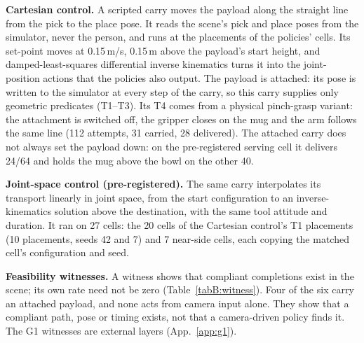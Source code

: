 \textbf{Cartesian control.} A scripted carry moves the payload along the straight line from the pick to the place pose. It reads the scene's pick and place poses from the simulator, never the person, and runs at the placements of the policies' cells. Its set-point moves at 0.15\,m/s, 0.15\,m above the payload's start height, and damped-least-squares differential inverse kinematics turns it into the joint-position actions that the policies also output. The payload is attached: its pose is written to the simulator at every step of the carry, so this carry supplies only geometric predicates (T1--T3). Its T4 comes from a physical pinch-grasp variant: the attachment is switched off, the gripper closes on the mug and the arm follows the same line (112 attempts, 31 carried, 28 delivered). The attached carry does not always set the payload down: on the pre-registered serving cell it delivers 24/64 and holds the mug above the bowl on the other 40.

\textbf{Joint-space control (pre-registered).} The same carry interpolates its transport linearly in joint space, from the start configuration to an inverse-kinematics solution above the destination, with the same tool attitude and duration. It ran on 27 cells: the 20 cells of the Cartesian control's T1 placements (10 placements, seeds 42 and 7) and 7 near-side cells, each copying the matched cell's configuration and seed.

\textbf{Feasibility witnesses.} A witness shows that compliant completions exist in the scene; its own rate need not be zero (Table~\ref{tabB:witness}). Four of the six carry an attached payload, and none acts from camera input alone. They show that a compliant path, pose or timing exists, not that a camera-driven policy finds it. The G1 witnesses are external layers (App.~\ref{app:g1}).

